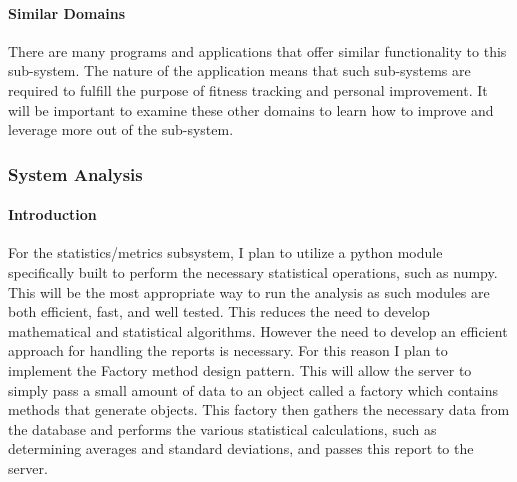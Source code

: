\documentclass{article}
\begin{document}
\paragraph{Similar Domains}
There are many programs and applications that offer similar functionality to this sub-system. The nature of the application means that such sub-systems are required to fulfill the purpose of fitness tracking and personal improvement. It will be important to examine these other domains to learn how to improve and leverage more out of the sub-system.

\subsubsection{System Analysis}
\paragraph{Introduction}
For the statistics/metrics subsystem, I plan to utilize a python module specifically built to perform the necessary statistical operations, such as numpy. 
This will be the most appropriate way to run the analysis as such modules are both efficient, fast, and well tested. This reduces the need to develop mathematical and statistical algorithms. 
However the need to develop an efficient approach for handling the reports is necessary. For this reason I plan to implement the Factory method design pattern. This will allow the server to 
simply pass a small amount of data to an object called a factory which contains methods that generate objects. This factory then gathers the necessary data from the database and performs the 
various statistical calculations, such as determining averages and standard deviations, and passes this report to the server.
\end{document}
